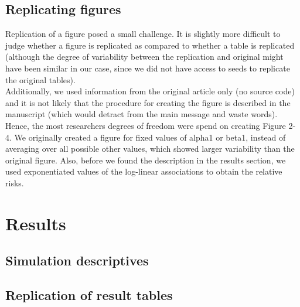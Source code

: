 \documentclass[10,a4paperpaper,]{article}
\begin{document}
\subsection{Replicating figures}

Replication of a figure posed a small challenge. It is slightly more
difficult to judge whether a figure is replicated as compared to whether
a table is replicated (although the degree of variability between the
replication and original might have been similar in our case, since we
did not have access to seeds to replicate the original tables).\\
Additionally, we used information from the original article only (no
source code) and it is not likely that the procedure for creating the
figure is described in the manuscript (which would detract from the main
message and waste words). Hence, the most researchers degrees of freedom
were spend on creating Figure 2-4. We originally created a figure for
fixed values of alpha1 or beta1, instead of averaging over all possible
other values, which showed larger variability than the original figure.
Also, before we found the description in the results section, we used
exponentiated values of the log-linear associations to obtain the
relative risks.

\section{Results}

\subsection{Simulation descriptives}

\subsection{Replication of result tables}
\end{document}
